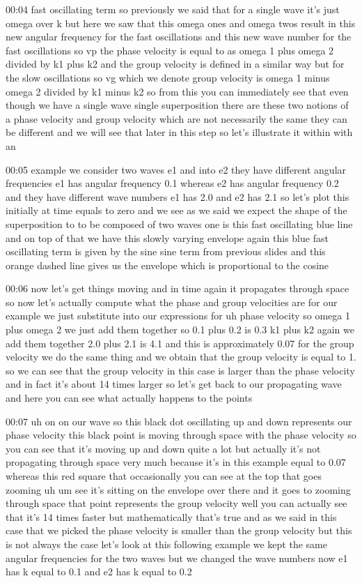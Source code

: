 00:04
fast oscillating term so previously we said that for a single wave it's just
omega over k but here we saw that this omega ones and omega twos result in this
new angular frequency for the fast oscillations
and this new wave number for the fast oscillations
so vp the phase velocity is equal to as omega 1 plus omega 2 divided by k1
plus k2 and the group velocity is defined in a similar way but for the
slow oscillations so vg which we denote group velocity
is omega 1 minus omega 2 divided by k1 minus k2 so from this you can
immediately see that even though we have a single wave single superposition
there are these two notions of a phase velocity and group velocity
which are not necessarily the same they can be different
and we will see that later in this step so let's illustrate it within with an

00:05
example we consider two waves e1 and into e2
they have different angular frequencies e1 has angular frequency 0.1
whereas e2 has angular frequency 0.2 and they have different
wave numbers e1 has 2.0 and e2 has 2.1 so let's plot this
initially at time equals to zero and we see as we said
we expect the shape of the superposition to to be composed of two waves
one is this fast oscillating blue line and on top of that we have this
slowly varying envelope again this blue fast oscillating term is
given by the sine sine term from previous slides and this orange
dashed line gives us the envelope which is proportional to the cosine

00:06
now let's get things moving and in time again it propagates through space
so now let's actually compute what the phase and group velocities are
for our example we just substitute into our expressions
for uh phase velocity so omega 1 plus omega 2
we just add them together so 0.1 plus 0.2 is 0.3 k1 plus k2
again we add them together 2.0 plus 2.1 is 4.1 and this is approximately 0.07
for the group velocity we do the same thing and we obtain that the group
velocity is equal to 1. so we can see that the group velocity in
this case is larger than the phase velocity
and in fact it's about 14 times larger so let's get back to our propagating
wave and here you can see what actually happens to the points

00:07
uh on on our wave so this black dot oscillating up and down represents
our phase velocity this black point is moving
through space with the phase velocity so
you can see that it's moving up and down quite a lot but actually it's not
propagating through space very much because it's in this example equal to 0.07
whereas this red square that occasionally you can see at the top
that goes zooming uh um see it's sitting on the envelope over there and it goes
to zooming through space that point represents the group velocity
well you can actually see that it's 14 times faster but
mathematically that's true and as we said in this case that we picked the phase
velocity is smaller than the group velocity
but this is not always the case let's look at this following example
we kept the same angular frequencies for the two waves but
we changed the wave numbers now e1 has k equal to 0.1 and e2 has k equal to 0.2

